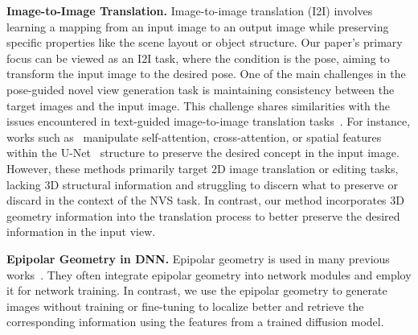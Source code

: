 \noindent\textbf{Image-to-Image Translation.}
Image-to-image translation (I2I) involves learning a mapping from an input image to an output image while preserving specific properties like the scene layout or object structure. 
Our paper's primary focus can be viewed as an I2I task, where the condition is the pose, aiming to transform the input image to the desired pose.
One of the main challenges in the pose-guided novel view generation task is maintaining consistency between the target images and the input image. 
This challenge shares similarities with the issues encountered in text-guided image-to-image translation tasks~\cite{p2p, pnp, masactrl, imagic, dragondiffusion}.
For instance, works such as~\cite{p2p, pnp, masactrl} manipulate self-attention, cross-attention, or spatial features within the U-Net~\cite{unet} structure to preserve the desired concept in the input image.
However, these methods primarily target 2D image translation or editing tasks, lacking 3D structural information and struggling to discern what to preserve or discard in the context of the NVS task. 
In contrast, our method incorporates 3D geometry information into the translation process to better preserve the desired information in the input view.

\noindent\textbf{Epipolar Geometry in DNN.}
Epipolar geometry is used in many previous works~\cite{tseng2023consistent, mvster, he2020epipolar, ecsic, suhail2022generalizable}.
They often integrate epipolar geometry into network modules and employ it for network training.
In contrast, we use the epipolar geometry to generate images without training or fine-tuning to localize better and retrieve the corresponding information using the features from a trained diffusion model.
